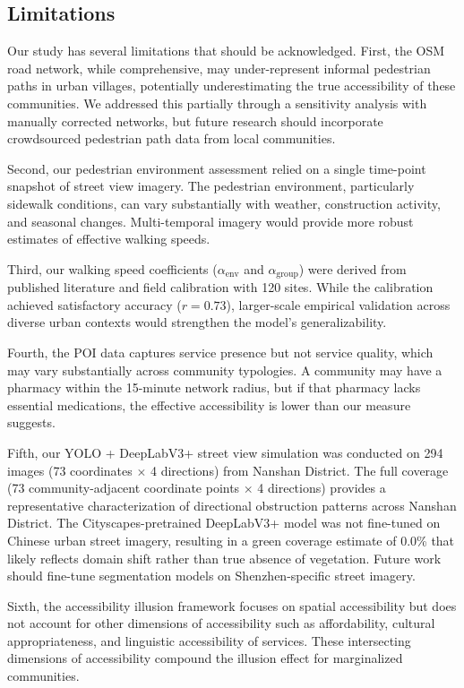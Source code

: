 \documentclass[10pt,conference,compsoc]{IEEEtran}
\begin{document}
\begin{table}[htbp]
\begin{center}
\subsection{Limitations}

Our study has several limitations that should be acknowledged. First, the OSM road network, while comprehensive, may under-represent informal pedestrian paths in urban villages, potentially underestimating the true accessibility of these communities. We addressed this partially through a sensitivity analysis with manually corrected networks, but future research should incorporate crowdsourced pedestrian path data from local communities.

Second, our pedestrian environment assessment relied on a single time-point snapshot of street view imagery. The pedestrian environment, particularly sidewalk conditions, can vary substantially with weather, construction activity, and seasonal changes. Multi-temporal imagery would provide more robust estimates of effective walking speeds.

Third, our walking speed coefficients ($\alpha_{\text{env}}$ and $\alpha_{\text{group}}$) were derived from published literature and field calibration with 120 sites. While the calibration achieved satisfactory accuracy ($r = 0.73$), larger-scale empirical validation across diverse urban contexts would strengthen the model's generalizability.

Fourth, the POI data captures service presence but not service quality, which may vary substantially across community typologies. A community may have a pharmacy within the 15-minute network radius, but if that pharmacy lacks essential medications, the effective accessibility is lower than our measure suggests.

Fifth, our YOLO + DeepLabV3+ street view simulation was conducted on 294 images (73 coordinates $\times$ 4 directions) from Nanshan District. The full coverage (73 community-adjacent coordinate points $\times$ 4 directions) provides a representative characterization of directional obstruction patterns across Nanshan District. The Cityscapes-pretrained DeepLabV3+ model was not fine-tuned on Chinese urban street imagery, resulting in a green coverage estimate of 0.0\% that likely reflects domain shift rather than true absence of vegetation. Future work should fine-tune segmentation models on Shenzhen-specific street imagery.

Sixth, the accessibility illusion framework focuses on spatial accessibility but does not account for other dimensions of accessibility such as affordability, cultural appropriateness, and linguistic accessibility of services. These intersecting dimensions of accessibility compound the illusion effect for marginalized communities.


\end{center}
\end{table}
\end{document}
